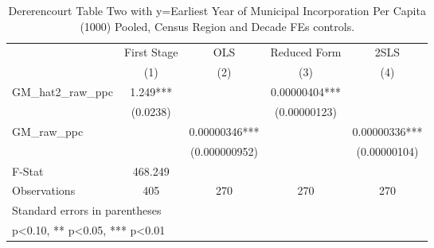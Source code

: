 \begin{table}[htbp]\centering
\def\sym#1{\ifmmode^{#1}\else\(^{#1}\)\fi}
\caption{Dererencourt Table Two with y=Earliest Year of Municipal Incorporation Per Capita (1000) Pooled, Census Region and Decade FEs controls.}
\begin{tabular}{l*{4}{c}}
\toprule
                    & First Stage   &         OLS   &Reduced Form   &        2SLS   \\
                    &\multicolumn{1}{c}{(1)}   &\multicolumn{1}{c}{(2)}   &\multicolumn{1}{c}{(3)}   &\multicolumn{1}{c}{(4)}   \\
\midrule
GM\_hat2\_raw\_ppc     &       1.249***&               &  0.00000404***&               \\
                    &    (0.0238)   &               &(0.00000123)   &               \\
\addlinespace
GM\_raw\_ppc          &               &  0.00000346***&               &  0.00000336***\\
                    &               &(0.000000952)   &               &(0.00000104)   \\
\midrule
F-Stat              &     468.249   &               &               &               \\
Observations        &         405   &         270   &         270   &         270   \\
\bottomrule
\multicolumn{5}{l}{\footnotesize Standard errors in parentheses}\\
\multicolumn{5}{l}{\footnotesize * p<0.10, ** p<0.05, *** p<0.01}\\
\end{tabular}
\end{table}
